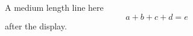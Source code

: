 \documentclass[10pt]{article}
\begin{document}
\setlength{\parindent}{15pt}
A medium length line here
\[ a + b + c + d = e \]
after the display.
\end{document}
